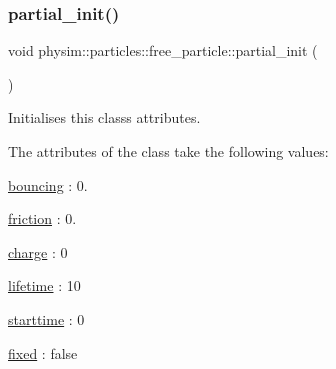 \mbox{\label{classphysim_1_1particles_1_1free__particle_a967f3229ac014999de8f9823882c60e8}} 
\subsubsection{\texorpdfstring{partial\+\_\+init()}{partial\_init()}}
{\footnotesize\ttfamily void physim\+::particles\+::free\+\_\+particle\+::partial\+\_\+init (\begin{DoxyParamCaption}{ }\end{DoxyParamCaption})\hspace{0.3cm}{\ttfamily [private]}}



Initialises this class\textquotesingle{}s attributes. 

The attributes of the class take the following values\+:
\begin{DoxyItemize}
\item \hyperlink{classphysim_1_1particles_1_1free__particle_aac766fa5294e47b944d32ca3e38d47fa}{bouncing} \+: 0.
\item \hyperlink{classphysim_1_1particles_1_1free__particle_a9e7dfd81e9392fc42b3faecb57afdc02}{friction} \+: 0.
\item \hyperlink{classphysim_1_1particles_1_1free__particle_a7513ac41f3cab1ce083f8695e2c73301}{charge} \+: 0
\item \hyperlink{classphysim_1_1particles_1_1free__particle_a5870d6fd3167d2c6120f887f45fe50fc}{lifetime} \+: 10
\item \hyperlink{classphysim_1_1particles_1_1free__particle_ad0379ba926ecc909bfbfb373045bfcf9}{starttime} \+: 0
\item \hyperlink{classphysim_1_1particles_1_1free__particle_a0f6d69caeac140abd74c7be4ed55eb74}{fixed} \+: false 
\end{DoxyItemize}\mbox{\label{classphysim_1_1particles_1_1free__particle_a8b8e76a24759a1e0a5d3b0d4933e31c1}} 
